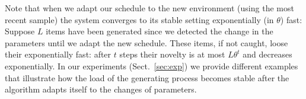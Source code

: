 
Note that when we adapt our schedule to the new environment (using the most
recent sample) the system converges to its stable setting exponentially (in
$\theta$) fast: Suppose $L$ items have been generated since we detected the
change in the parameters until we adapt the new schedule. These items, if not
caught, loose their  exponentially fast: after $t$ steps their
novelty is at most $L\theta^t$ and decreases exponentially. In our experiments
(Sect.~\ref{sec:exp}) we provide different examples that illustrate how the load
of the generating process becomes stable after the algorithm adapts itself to
the changes of parameters.

%
%
%
%
%
%
%

